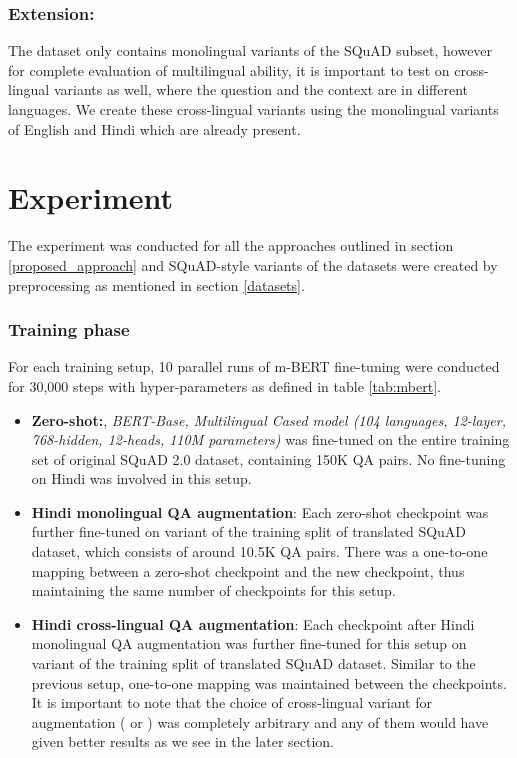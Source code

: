 \documentclass[acmsmall]{acmart}
\begin{document}
\subsubsection{Extension:} The dataset only contains monolingual variants of the SQuAD subset, however for complete evaluation of multilingual ability, it is important to test on cross-lingual variants as well, where the question and the context are in different languages. We create these cross-lingual variants using the monolingual variants of English and Hindi which are already present. 
 

\section{Experiment}
\par The experiment was conducted for all the approaches outlined in section \ref{proposed_approach} and SQuAD-style variants of the datasets were created by preprocessing as mentioned in section \ref{datasets}. 
\subsubsection{Training phase} For each training setup, 10 parallel runs of m-BERT fine-tuning were conducted for 30,000 steps with hyper-parameters as defined in table \ref{tab:mbert}. 
\begin{itemize}
    \item \textbf{Zero-shot:}, \textit{BERT-Base, Multilingual Cased model (104 languages, 12-layer, 768-hidden, 12-heads, 110M parameters)} was fine-tuned on the entire training set of original SQuAD 2.0 dataset, containing 150K QA pairs. No fine-tuning on Hindi was involved in this setup. 
    \item \textbf{Hindi monolingual QA augmentation}: Each zero-shot checkpoint was further fine-tuned on  variant of the training split of translated SQuAD dataset, which consists of around 10.5K QA pairs. There was a one-to-one mapping between a zero-shot checkpoint and the new checkpoint, thus maintaining the same number of checkpoints for this setup.  
    \item \textbf{Hindi cross-lingual QA augmentation}: Each checkpoint after Hindi monolingual QA augmentation was further fine-tuned for this setup on  variant of the training split of translated SQuAD dataset. Similar to the previous setup, one-to-one mapping was maintained between the checkpoints. It is important to note that the choice of cross-lingual variant for augmentation ( or ) was completely arbitrary and any of them would have given better results as we see in the later section. 
\end{itemize}
\end{document}

